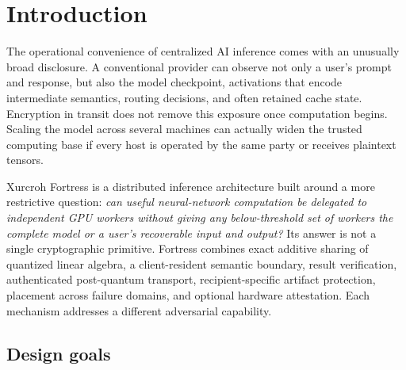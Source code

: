 \section{Introduction}\label{sec:introduction}

The operational convenience of centralized AI inference comes with an unusually broad disclosure. A conventional provider can observe not only a user's prompt and response, but also the model checkpoint, activations that encode intermediate semantics, routing decisions, and often retained cache state. Encryption in transit does not remove this exposure once computation begins. Scaling the model across several machines can actually widen the trusted computing base if every host is operated by the same party or receives plaintext tensors.

Xurcroh Fortress is a distributed inference architecture built around a more restrictive question: \emph{can useful neural-network computation be delegated to independent GPU workers without giving any below-threshold set of workers the complete model or a user's recoverable input and output?} Its answer is not a single cryptographic primitive. Fortress combines exact additive sharing of quantized linear algebra, a client-resident semantic boundary, result verification, authenticated post-quantum transport, recipient-specific artifact protection, placement across failure domains, and optional hardware attestation. Each mechanism addresses a different adversarial capability.

\subsection{Design goals}

